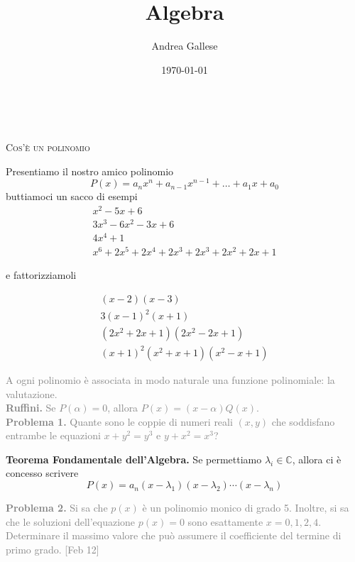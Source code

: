 \documentclass[a4paper]{article}
\title{Algebra}\let\Title\@title
\author{Andrea Gallese}\let\Author\@author
\date{\today}\let\Date\@date
\newcommand{\Intitola}{\begin{center}
		\vspace*{0,5 cm}
		{\Huge \textsc{\Title}} \\
		\vspace{0,5 cm}
		\textsc{\Author} \hspace{1cm} \textsc{\Date}
		\thispagestyle{empty}
		\vspace{0,7 cm}
\end{center}}
\theoremstyle{remark}
\theoremstyle{definition}
\begin{document}
\Intitola
\small
\begin{multicols}{2}
	\begin{center}
		\textsc{Cos'è un polinomio}
	\end{center}

	Presentiamo il nostro amico polinomio
	\[ P(x) = a_nx^n + a_{n-1}x^{n-1} + \dots + a_1 x + a_0 \]
	buttiamoci un sacco di esempi
	\begin{equation*}
	\begin{array}{c}
	x^2 - 5x +6\\
	3x^3 - 6x^2 -3x + 6\\
	4x^4 +1\\
	x^6 +2x^5 + 2x^4 +2x^3 + 2x^3 + 2x^2 + 2x +1
	\end{array}
	\end{equation*}
	
	e fattorizziamoli
	
	\begin{equation*}
	\begin{array}{c}
	(x-2)(x-3) \\
	3(x-1)^2(x+1) \\
	(2x^2 + 2x +1)(2x^2 -2x +1) \\
	(x+1)^2(x^2+x+1)(x^2-x+1)
	\end{array}
	\end{equation*}
	
	\textcolor{gray}{A ogni polinomio è associata in modo naturale una funzione polinomiale: la valutazione.} \\
	
	\textcolor{gray}{\textbf{Ruffini.} Se $ P(\alpha) = 0 $, allora $ P(x) = (x-\alpha)Q(x) $.} \\
	
	\textcolor{gray}{\textbf{Problema 1.} Quante sono le coppie di numeri reali $ (x,y) $ che soddisfano entrambe le equazioni $ x + y^2 = y^3 $ e $ y + x^2 = x^3 $? \\}
	
	\textbf{Teorema Fondamentale dell'Algebra.} Se permettiamo $ \lambda_i \in \mathbb{C} $, allora ci è concesso scrivere
	\[ P(x) = a_n(x-\lambda_1)(x-\lambda_2) \cdots (x-\lambda_n) \]
	
	\textcolor{gray}{\textbf{Problema 2.} Si sa che $ p(x) $ è un polinomio monico di grado 5. Inoltre, si sa che le soluzioni dell’equazione $ p(x) = 0 $ sono esattamente $ x = 0, 1, 2, 4 $. Determinare il massimo valore che può assumere il coefficiente del termine di primo grado. [Feb 12]}\\
	

\end{multicols}
\end{document}
